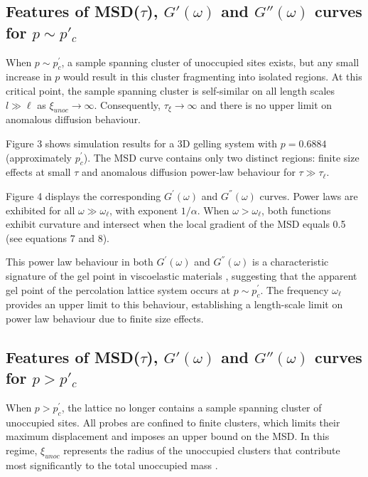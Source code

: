 \documentclass[%
 aip,
 amsmath,amssymb,
reprint, onecolumn %
]{revtex4-1}
\begin{document}
\subsection{Features of MSD($\tau$), $G'(\omega)$ and $G''(\omega)$ curves for $p \sim p'_c$}

When $p \sim p_{c}^{'}$, a sample spanning cluster of unoccupied sites exists, but any small increase in $p$ would result in this cluster fragmenting into isolated regions. At this critical point, the sample spanning cluster is self-similar on all length scales $l \gg \ell$ as $\xi_{unoc} \rightarrow \infty$. Consequently, $\tau_{\xi} \rightarrow \infty$ and there is no upper limit on anomalous diffusion behaviour.

Figure 3 shows simulation results for a 3D gelling system with $p = 0.6884$ (approximately $p_{c}^{'}$). The MSD curve contains only two distinct regions: finite size effects at small $\tau$ and anomalous diffusion power-law behaviour for $\tau \gg \tau_{\ell}$.



Figure 4 displays the corresponding $G^{'}(\omega)$ and $G^{''}(\omega)$ curves. Power laws are exhibited for all $\omega \gg \omega_{\ell}$, with exponent $1/\alpha$. When $\omega > \omega_{\ell}$, both functions exhibit curvature and intersect when the local gradient of the MSD equals 0.5 (see equations 7 and 8).

This power law behaviour in both $G^{'}(\omega)$ and $G^{''}(\omega)$ is a characteristic signature of the gel point in viscoelastic materials \cite{Chambon1987}, suggesting that the apparent gel point of the percolation lattice system occurs at $p \sim p_{c}^{'}$. The frequency $\omega_{\ell}$ provides an upper limit to this behaviour, establishing a length-scale limit on power law behaviour due to finite size effects.

\subsection{Features of MSD($\tau$), $G'(\omega)$ and $G''(\omega)$ curves for $p > p'_c$}

When $p > p_{c}^{'}$, the lattice no longer contains a sample spanning cluster of unoccupied sites. All probes are confined to finite clusters, which limits their maximum displacement and imposes an upper bound on the MSD. In this regime, $\xi_{unoc}$ represents the radius of the unoccupied clusters that contribute most significantly to the total unoccupied mass \cite{Ben-Avraham2000,Stauffer1992}.
\end{document}
